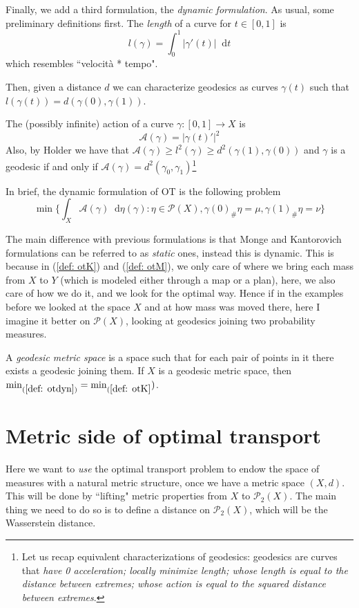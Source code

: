 \documentclass[a4paper,12pt,reqno]{amsbook}
\theoremstyle{definition} %
\newcommand*\de{\mathop{}\!\mathrm{d}}
\newcommand{\1}{\mathbbm{1}}
\newcommand{\mP}{\mathscr{P}}
\newcommand{\A}{\mathcal{A}} %
\theoremstyle{plain}
\theoremstyle{remark}
\begin{document}
Finally, we add a third formulation, the \emph{dynamic formulation}. 
As usual, some preliminary definitions first. 
The \emph{length} of a curve for $t\in[0,1]$ is 
\[
l(\gamma)=\int_0^1 |\gamma'(t)| \de t
\]
which resembles ``velocità * tempo".

Then, given a distance $d$ we can characterize geodesics as curves $\gamma(t)$ such that $l(\gamma(t))=d(\gamma(0),\gamma(1))$.

\begin{definition} \label{def: action}
    The (possibly infinite) action of a curve $\gamma:[0,1]\to X$ is 
    \[
    \A(\gamma)= |\gamma(t)'|^2 
    \]
    Also, by Holder we have that $\A(\gamma) \ge l^2(\gamma) \ge d^2(\gamma(1),\gamma(0))$ and $\gamma$ is a geodesic if and only if $\A(\gamma)=d^2(\gamma_0,\gamma_1)$\footnote{Let us recap equivalent characterizations of geodesics: geodesics are curves that \textit{have 0 acceleration; locally minimize length; whose length is equal to the distance between extremes; whose action is equal to the squared distance between extremes}. }
\end{definition} 

In brief, the dynamic formulation of OT is the following problem
\begin{equation}\tag{dyn}\label{def: otdyn}
    \min \bigg\{\int_X \A(\gamma) \de \eta(\gamma) : \eta \in \mP(X), \gamma(0)_\#\eta = \mu, \gamma(1)_\# \eta = \nu \bigg\}
\end{equation}

The main difference with previous formulations is that Monge and Kantorovich formulations can be referred to as \emph{static} ones, instead this is dynamic. This is because in (\ref{def: otK}) and (\ref{def: otM}), we only care of where we bring each mass from $X$ to $Y$ (which is modeled either through a map or a plan), here, we also care of how we do it, and we look for the optimal way. Hence if in the examples before we looked at the space $X$ and at how mass was moved there, here I imagine it better on $\mP(X)$, looking at geodesics joining two probability measures. 


A \emph{geodesic metric space} is a space such that for each pair of points in it there exists a geodesic joining them. If $X$ is a geodesic metric space, then $\min_{(\ref{def: otdyn})}=\min_{(\ref{def: otK}})$. 


\section{Metric side of optimal transport}
Here we want to \textit{use} the optimal transport problem to endow the space of measures with a natural metric structure, once we have a metric space $(X,d)$. This will be done by ``lifting" metric properties from $X$ to $\mP_2(X)$. The main thing we need to do so is to define a distance on $\mP_2(X)$, which will be the Wasserstein distance. 
\end{document}
